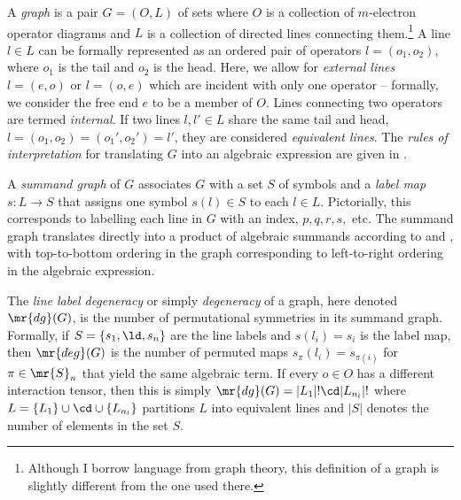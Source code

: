 \documentclass[11pt,fleqn]{article}
\numberwithin{equation}{section}
\begin{document}
\begin{dfn}\label{dfn:graph}
A \textit{graph} is a pair $G=(O, L)$ of sets where $O$ is a collection of $m$-electron operator diagrams and $L$ is a collection of directed lines connecting them.\footnote{Although I borrow language from graph theory, this definition of a graph is slightly different from the one used there.}
A line $l\in L$ can be formally represented as an ordered pair of operators $l=(o_1,o_2)$, where $o_1$ is the tail and $o_2$ is the head.
Here, we allow for \textit{external lines} $l=(e,o)$ or $l=(o,e)$ which are incident with only one operator -- formally, we consider the free end $e$ to be a member of $O$.
Lines connecting two operators are termed \textit{internal}.
If two lines $l,l'\in L$ share the same tail and head, $l=(o_1,o_2)=(o_1',o_2')=l'$, they are considered \textit{equivalent lines}.
The \textit{rules of interpretation} for translating $G$ into an algebraic expression are given in .
\end{dfn}

\begin{dfn}
A \textit{summand graph} of $G$ associates $G$ with a set $S$ of symbols and a \textit{label map} $s:L\rightarrow S$ that assigns one symbol $s(l)\in S$ to each $l\in L$.
Pictorially, this corresponds to labelling each line in $G$ with an index, $p,q,r,s,$ etc.
The summand graph translates directly into a product of algebraic summands according to  and , with top-to-bottom ordering in the graph corresponding to left-to-right ordering in the algebraic expression.
\end{dfn}

\begin{dfn}
The \textit{line label degeneracy} or simply \textit{degeneracy} of a graph, here denoted $\mr{dg}(G)$, is the number of permutational symmetries in its summand graph.
Formally, if $S=\{s_1,\ld,s_n\}$ are the line labels and $s(l_i)=s_i$ is the label map, then $\mr{deg}(G)$ is the number of permuted maps $s_{\pi}(l_i)=s_{\pi(i)}$ for $\pi\in\mr{S}_n$ that yield the same algebraic term.
If every $o\in O$ has a different interaction tensor, then this is simply $\mr{dg}(G)=|L_1|!\cd|L_{n_l}|!$ where $L=\{L_1\}\cup\cd\cup\{L_{n_l}\}$ partitions $L$ into equivalent lines and $|S|$ denotes the number of elements in the set $S$.
\end{dfn}
\end{document}
